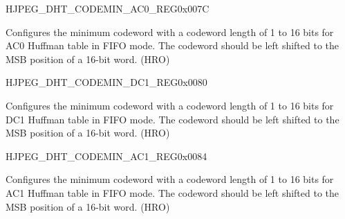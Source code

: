 \begin{register}{H}{JPEG\_DHT\_CODEMIN\_AC0\_REG}{0x007C}\label{regdesc:JPEGDHTCODEMINAC0REG}
%
\regnewline%
\begin{regdesc}\begin{reglist}
\label{fielddesc:JPEGDHTCODEMINAC0}\item [JPEG\_DHT\_CODEMIN\_AC0] Configures the minimum codeword with a codeword length of 1 to 16 bits for AC0 Huffman table in FIFO mode. The codeword should be left shifted to the MSB position of a 16-bit word. (HRO)
\end{reglist}\end{regdesc}
\end{register}


\begin{register}{H}{JPEG\_DHT\_CODEMIN\_DC1\_REG}{0x0080}\label{regdesc:JPEGDHTCODEMINDC1REG}
%
\regnewline%
\begin{regdesc}\begin{reglist}
\label{fielddesc:JPEGDHTCODEMINDC1}\item [JPEG\_DHT\_CODEMIN\_DC1] Configures the minimum codeword with a codeword length of 1 to 16 bits for DC1 Huffman table in FIFO mode. The codeword should be left shifted to the MSB position of a 16-bit word. (HRO)
\end{reglist}\end{regdesc}
\end{register}


\begin{register}{H}{JPEG\_DHT\_CODEMIN\_AC1\_REG}{0x0084}\label{regdesc:JPEGDHTCODEMINAC1REG}
%
\regnewline%
\begin{regdesc}\begin{reglist}
\label{fielddesc:JPEGDHTCODEMINAC1}\item [JPEG\_DHT\_CODEMIN\_AC1] Configures the minimum codeword with a codeword length of 1 to 16 bits for AC1 Huffman table in FIFO mode. The codeword should be left shifted to the MSB position of a 16-bit word. (HRO)
\end{reglist}\end{regdesc}
\end{register}


